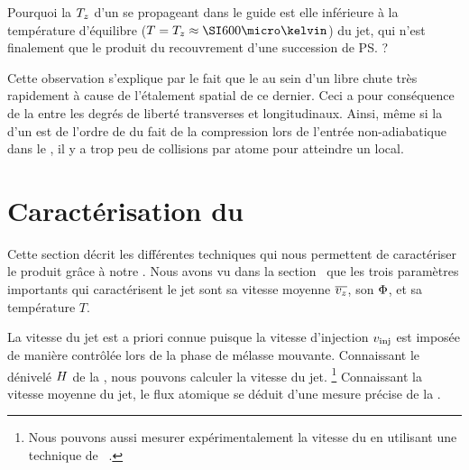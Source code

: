 \noindent Pourquoi la \templong $T_{z}$ d'un \p se propageant dans le guide est elle inférieure à la température d'équilibre ($T=\Tlong\approx\microK{600}$) du jet, qui n'est finalement que le produit du recouvrement d'une succession de \ps ?

\noindent Cette observation s'explique par le fait que le \tcolel au sein d'un \pat libre chute très rapidement à cause de l'étalement spatial de ce dernier. Ceci a pour conséquence de  la \reth entre les degrés de liberté transverses et longitudinaux. 
Ainsi, même si la \tempt d'un \p est de l'ordre de  du fait de la compression lors de l'entrée non-adiabatique dans le \gm, il y a trop peu de collisions par atome pour atteindre un \eqthdy local.



\section{Caractérisation du \jat} \label{sec:MesureJat}

Cette section décrit les différentes techniques qui nous permettent de caractériser le \jatg produit grâce à notre \setup. Nous avons vu dans la section~ que les trois paramètres importants qui caractérisent le jet sont sa vitesse moyenne ${\overline{v_z}}$, son \fat ${\Phi}$, et sa température $T$.%

La vitesse du jet est a priori connue puisque la vitesse d'injection $v_{{\rm {inj}}}$ est imposée de manière contrôlée lors de la phase de mélasse mouvante. Connaissant le dénivelé ${H}$ de la \secpent, nous pouvons calculer la vitesse du jet.%
\footnote{Nous pouvons aussi mesurer expérimentalement la vitesse du \jat en utilisant une technique de ~\cite{TTL}.} 
Connaissant la vitesse moyenne du jet, le flux atomique se déduit d'une mesure précise de la \datlin. 

